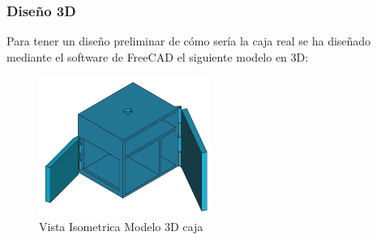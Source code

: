 \subsubsection{Diseño 3D}

Para tener un diseño preliminar de cómo sería la caja real se ha diseñado mediante el software de FreeCAD el siguiente modelo en 3D:

\begin{figure}[H]
    \centering
    \includegraphics[width=0.5\textwidth]{images/4-DesarrolloTeorico/4-1-caja/CAJA_3D_ISOMETRICA.png}
    \caption{Vista Isometrica Modelo 3D caja}
    \label{fig:DesarrolloTeorico/Caja/CAJA_3D_ISOMETRICA}
\end{figure}



